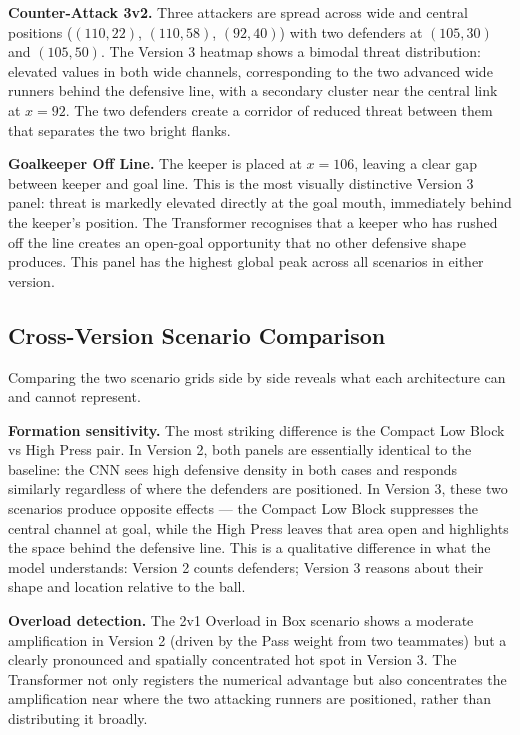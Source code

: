 \documentclass{article}
\begin{document}
\textbf{Counter-Attack 3v2.} Three attackers are spread across wide and central positions ($(110, 22)$, $(110, 58)$, $(92, 40)$) with two defenders at $(105, 30)$ and $(105, 50)$. The Version 3 heatmap shows a bimodal threat distribution: elevated values in both wide channels, corresponding to the two advanced wide runners behind the defensive line, with a secondary cluster near the central link at $x = 92$. The two defenders create a corridor of reduced threat between them that separates the two bright flanks.

\textbf{Goalkeeper Off Line.} The keeper is placed at $x = 106$, leaving a clear gap between keeper and goal line. This is the most visually distinctive Version 3 panel: threat is markedly elevated directly at the goal mouth, immediately behind the keeper's position. The Transformer recognises that a keeper who has rushed off the line creates an open-goal opportunity that no other defensive shape produces. This panel has the highest global peak across all scenarios in either version.

\subsection{Cross-Version Scenario Comparison}

Comparing the two scenario grids side by side reveals what each architecture can and cannot represent.

\textbf{Formation sensitivity.} The most striking difference is the Compact Low Block vs High Press pair. In Version 2, both panels are essentially identical to the baseline: the CNN sees high defensive density in both cases and responds similarly regardless of where the defenders are positioned. In Version 3, these two scenarios produce opposite effects --- the Compact Low Block suppresses the central channel at goal, while the High Press leaves that area open and highlights the space behind the defensive line. This is a qualitative difference in what the model understands: Version 2 counts defenders; Version 3 reasons about their shape and location relative to the ball.

\textbf{Overload detection.} The 2v1 Overload in Box scenario shows a moderate amplification in Version 2 (driven by the Pass weight from two teammates) but a clearly pronounced and spatially concentrated hot spot in Version 3. The Transformer not only registers the numerical advantage but also concentrates the amplification near where the two attacking runners are positioned, rather than distributing it broadly.
\end{document}
